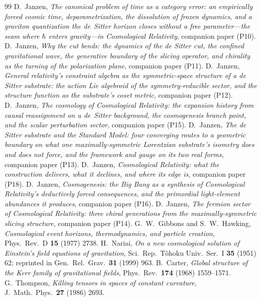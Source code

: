 \documentclass[11pt,a4paper]{article}
\theoremstyle{definition}
\begin{document}
\begin{thebibliography}{99}
 D.~Janzen, \emph{The canonical problem of time as a category error: an empirically forced cosmic time, deparametrization, the dissolution of frozen dynamics, and a graviton quantization the de~Sitter horizon closes without a free parameter---the seam where $\hbar$ enters gravity---in Cosmological Relativity}, companion paper (P10).
 D.~Janzen, \emph{Why the cut bends: the dynamics of the de Sitter cut, the confined gravitational wave, the generative boundary of the slicing operator, and chirality as the turning of the polarization plane}, companion paper (P11).
 D.~Janzen, \emph{General relativity's constraint algebra as the symmetric-space structure of a de Sitter substrate: the action Lie algebroid of the symmetry-reducible sector, and the structure function as the substrate's coset metric}, companion paper (P12).
 D.~Janzen, \emph{The cosmology of Cosmological Relativity: the expansion history from causal reassignment on a de~Sitter background, the cosmogenesis branch point, and the scalar perturbation sector}, companion paper (P15).
 D.~Janzen, \emph{The de Sitter substrate and the Standard Model: four converging routes to a geometric boundary on what one maximally-symmetric Lorentzian substrate's isometry does and does not force, and the framework and gauge on its two real forms}, companion paper (P13).
 D.~Janzen, \emph{Cosmological Relativity: what the construction delivers, what it declines, and where its edge is}, companion paper (P18).
 D.~Janzen, \emph{Cosmogenesis: the Big Bang as a synthesis of Cosmological Relativity's deductively forced consequences, and the primordial light-element abundances it produces}, companion paper (P16).
 D.~Janzen, \emph{The fermion sector of Cosmological Relativity: three chiral generations from the maximally-symmetric slicing structure}, companion paper (P14).
 G.~W.~Gibbons and S.~W.~Hawking, \emph{Cosmological event horizons, thermodynamics, and particle creation}, Phys.\ Rev.\ D \textbf{15} (1977) 2738.
 H.~Nariai, \emph{On a new cosmological solution of Einstein's field equations of gravitation}, Sci.\ Rep.\ T\^ohoku Univ.\ Ser.\ I \textbf{35} (1951) 62; reprinted in Gen.\ Rel.\ Grav.\ \textbf{31} (1999) 963.
B.~Carter,
\emph{Global structure of the Kerr family of gravitational fields},
Phys.~Rev.~\textbf{174} (1968) 1559--1571.
 G.~Thompson, \emph{Killing tensors in spaces of constant curvature}, J.\ Math.\ Phys.\ \textbf{27} (1986) 2693.

\end{thebibliography}
\end{document}
